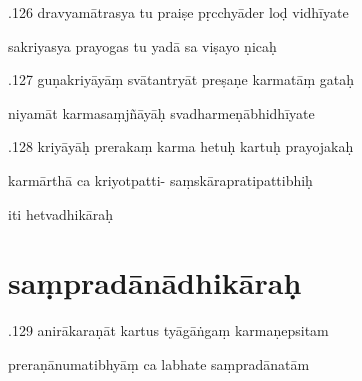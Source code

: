 \documentclass[article,12pt,a4paper]{memoir}%
\newcounter{parCount}
\begin{document}
	  
	  \pstart {}.126 dravyamātrasya tu praiṣe pṛcchyāder loḍ vidhīyate 
	{}
	\pend%
      

	  
	  \pstart \leavevmode%
	sakriyasya prayogas tu yadā sa viṣayo ṇicaḥ 
	{}
	\pend%
      

	  
	  \pstart {}.127 guṇakriyāyāṃ svātantryāt preṣaṇe karmatāṃ gataḥ 
	{}
	\pend%
      

	  
	  \pstart \leavevmode%
	niyamāt karmasaṃjñāyāḥ svadharmeṇābhidhīyate 
	{}
	\pend%
      

	  
	  \pstart {}.128 kriyāyāḥ prerakaṃ karma hetuḥ kartuḥ prayojakaḥ 
	{}
	\pend%
      

	  
	  \pstart \leavevmode%
	karmārthā ca kriyotpatti- saṃskārapratipattibhiḥ 
	{}
	\pend%
      

	  
	  \pstart \leavevmode%
	iti hetvadhikāraḥ 
	{}
	\pend%
      
	  
	
\chapter[{saṃpradānādhikāraḥ}][{saṃpradānādhikāraḥ}]{ saṃpradānādhikāraḥ}

	  
	  \pstart {}.129 anirākaraṇāt kartus tyāgāṅgaṃ karmaṇepsitam 
	{}
	\pend%
      

	  
	  \pstart \leavevmode%
	preraṇānumatibhyāṃ ca labhate saṃpradānatām 
	{}
	\pend%
      
\end{document}
